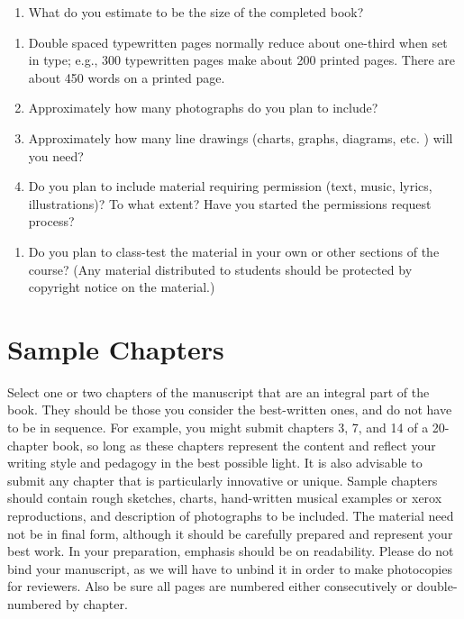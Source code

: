 \documentclass[
  10pt,
  dvipsnames,enabledeprecatedfontcommands]{scrartcl}
\providecommand{\tightlist}{%
  \setlength{\itemsep}{0pt}\setlength{\parskip}{0pt}}
\begin{document}
\begin{enumerate}
\def\labelenumi{\arabic{enumi}.}
\setcounter{enumi}{1}
\tightlist
\item
  What do you estimate to be the size of the completed book?
\end{enumerate}

\begin{enumerate}
\def\labelenumi{\alph{enumi}.}
\item
  Double spaced typewritten pages normally reduce about one-third when
  set in type; e.g., 300 typewritten pages make about 200 printed pages.
  There are about 450 words on a printed page.
\item
  Approximately how many photographs do you plan to include?
\item
  Approximately how many line drawings (charts, graphs, diagrams, etc. )
  will you need?
\item
  Do you plan to include material requiring permission (text, music,
  lyrics, illustrations)? To what extent? Have you started the
  permissions request process?
\end{enumerate}

\begin{enumerate}
\def\labelenumi{\arabic{enumi}.}
\setcounter{enumi}{2}
\tightlist
\item
  Do you plan to class-test the material in your own or other sections
  of the course? (Any material distributed to students should be
  protected by copyright notice on the material.)
\end{enumerate}

\normalsize

\hypertarget{sample-chapters}{%
\section{Sample Chapters}\label{sample-chapters}}

Select one or two chapters of the manuscript that are an integral part
of the book. They should be those you consider the best-written ones,
and do not have to be in sequence. For example, you might submit
chapters 3, 7, and 14 of a 20-chapter book, so long as these chapters
represent the content and reflect your writing style and pedagogy in the
best possible light. It is also advisable to submit any chapter that is
particularly innovative or unique. Sample chapters should contain rough
sketches, charts, hand-written musical examples or xerox reproductions,
and description of photographs to be included. The material need not be
in final form, although it should be carefully prepared and represent
your best work. In your preparation, emphasis should be on readability.
Please do not bind your manuscript, as we will have to unbind it in
order to make photocopies for reviewers. Also be sure all pages are
numbered either consecutively or double-numbered by chapter.
\end{document}
